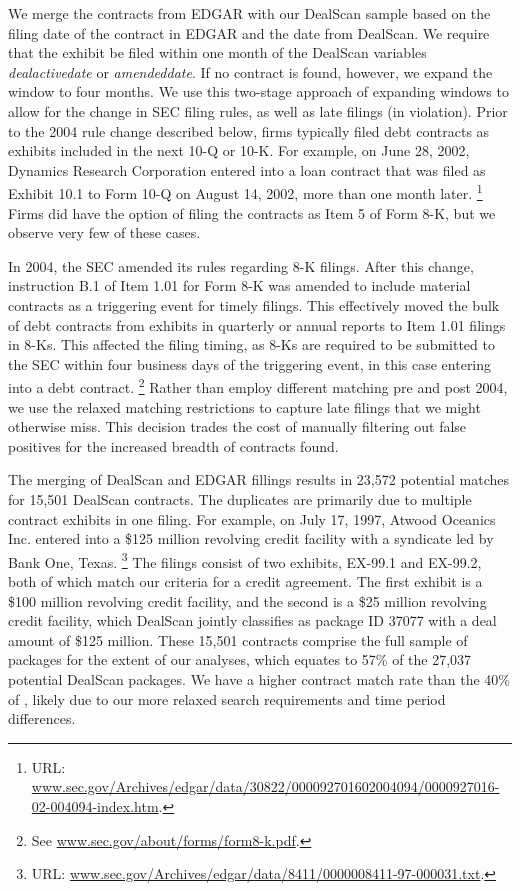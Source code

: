 \documentclass[12pt]{article}
\begin{document}
\begin{appendices}
We merge the contracts from EDGAR with our DealScan sample based on the filing date of the contract in EDGAR and the date from DealScan.
We require that the exhibit be filed within one month of the DealScan variables \textit{dealactivedate} or \textit{amendeddate}.
If no contract is found, however, we expand the window to four months.
We use this two-stage approach of expanding windows to allow for the change in SEC filing rules, as well as late filings (in violation).
Prior to the 2004 rule change described below, firms typically filed debt contracts as exhibits included in the next 10-Q or 10-K.
For example, on June 28, 2002, Dynamics Research Corporation entered into a loan contract that was filed as Exhibit 10.1 to Form 10-Q on August 14, 2002, more than one month later.%
    \footnote{URL: \href{http://www.sec.gov/Archives/edgar/data/30822/000092701602004094/0000927016-02-004094-index.htm}{www.sec.gov/Archives/edgar/data/30822/000092701602004094/0000927016-02-004094-index.htm}.}
Firms did have the option of filing the contracts as Item 5 of Form 8-K, but we observe very few of these cases.%


In 2004, the SEC amended its rules regarding 8-K filings.
After this change, instruction B.1 of Item 1.01 for Form 8-K was amended to include material contracts as a triggering event for timely filings.
This effectively moved the bulk of debt contracts from exhibits in quarterly or annual reports to Item 1.01 filings in 8-Ks.
This affected the filing timing, as 8-Ks are required to be submitted to the SEC within four business days of the triggering event, in this case entering into a debt contract.%
    \footnote{See \href{https://www.sec.gov/about/forms/form8-k.pdf}{www.sec.gov/about/forms/form8-k.pdf}.}
Rather than employ different matching pre and post 2004, we use the relaxed matching restrictions to capture late filings that we might otherwise miss.
This decision trades the cost of manually filtering out false positives for the increased breadth of contracts found.


The merging of DealScan and EDGAR fillings results in 23,572 potential matches for 15,501 DealScan contracts.
The duplicates are primarily due to multiple contract exhibits in one filing.
For example, on July 17, 1997, Atwood Oceanics Inc. entered into a \$125 million revolving credit facility with a syndicate led by Bank One, Texas.%
    \footnote{URL: \href{http://www.sec.gov/Archives/edgar/data/8411/0000008411-97-000031.txt}{www.sec.gov/Archives/edgar/data/8411/0000008411-97-000031.txt}.}
The filings consist of two exhibits, EX-99.1 and EX-99.2, both of which match our criteria for a credit agreement.
The first exhibit is a \$100 million revolving credit facility, and the second is a \$25 million revolving credit facility, which DealScan jointly classifies as package ID 37077 with a deal amount of \$125 million.
These 15,501 contracts comprise the full sample of packages for the extent of our analyses, which equates to 57\% of the 27,037 potential DealScan packages.
We have a higher contract match rate than the 40\% of \cite{Nini_2009}, likely due to our more relaxed search requirements and time period differences.



\end{appendices}
\end{document}
